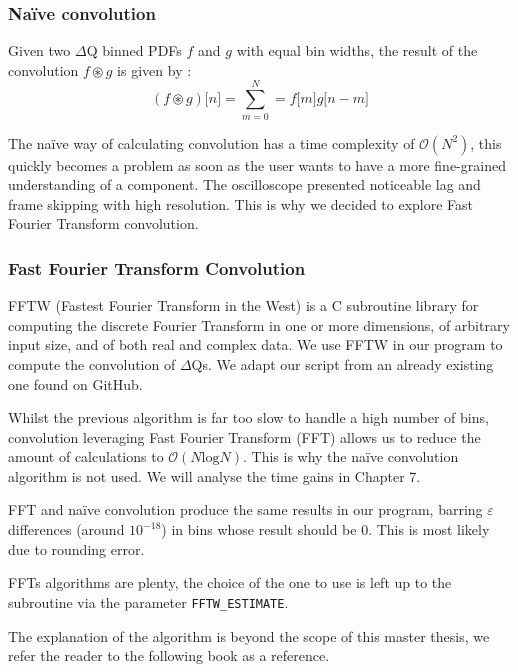         \subsubsection{Naïve convolution}
        Given two $\Delta$Q binned PDFs $f$ and $g$ with equal bin widths, the result of the convolution $f \circledast g$ is given by \cite{conv}: 
        \begin{equation}
            (f \circledast g)\lbrack n \rbrack = \sum_{m = 0}^{N} = f\lbrack m \rbrack g \lbrack n - m \rbrack  
            \label{eq:discconv}
        \end{equation}

        The naïve way of calculating convolution has a time complexity of $\mathcal{O}(N^2)$, this quickly becomes a problem as soon as the user wants to have a more fine-grained understanding of a component. The oscilloscope presented noticeable lag and frame skipping with high resolution. This is why we decided to explore Fast Fourier Transform convolution. 
 
    \subsubsection{Fast Fourier Transform Convolution}
        FFTW (Fastest Fourier Transform in the West) is a C subroutine library \cite{fftw3} for computing the discrete Fourier Transform in one or more dimensions, of arbitrary input size, and of both real and complex data. We use FFTW in our program to compute the convolution of $\Delta$Qs. We adapt our script from an already existing one found on GitHub. \cite{fft}
    
    Whilst the previous algorithm is far too slow to handle a high number of bins, convolution leveraging Fast Fourier Transform (FFT) allows us to reduce the amount of calculations to $\mathcal{O}(N \text{log} N)$. This is why the naïve convolution algorithm is not used. We will analyse the time gains in Chapter 7.
    
    FFT and naïve convolution produce the same results in our program, barring $\varepsilon$ differences (around $10^{-18}$) in bins whose result should be 0. This is most likely due to rounding error.
    
    FFTs algorithms are plenty, the choice of the one to use is left up to the subroutine via the parameter \texttt{FFTW\_ESTIMATE}. \cite{fft-h}
    
    The explanation of the algorithm is beyond the scope of this master thesis, we refer the reader to the following book as a reference. \cite{fft-book}

